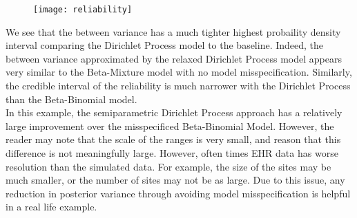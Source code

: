 \documentclass{article}
\begin{document}
\begin{figure}[H]
\texttt{[image: reliability]}
\end{figure}

We see that the between variance has a much tighter highest probaility density interval comparing the Dirichlet Process model to the baseline. Indeed, the between variance approximated by the relaxed Dirichlet Process model appears very similar to the Beta-Mixture model with no model misspecification. Similarly, the credible interval of the reliability is much narrower with the Dirichlet Process than the Beta-Binomial model. \\

In this example, the semiparametric Dirichlet Process approach has a relatively large improvement over the misspecificed Beta-Binomial Model. However, the reader may note that the scale of the ranges is very small, and reason that this difference is not meaningfully large. However, often times EHR data has worse resolution than the simulated data. For example, the size of the sites may be much smaller, or the number of sites may not be as large. Due  to this issue, any reduction in posterior variance through avoiding model misspecification is helpful in a real life example.


\end{document}
